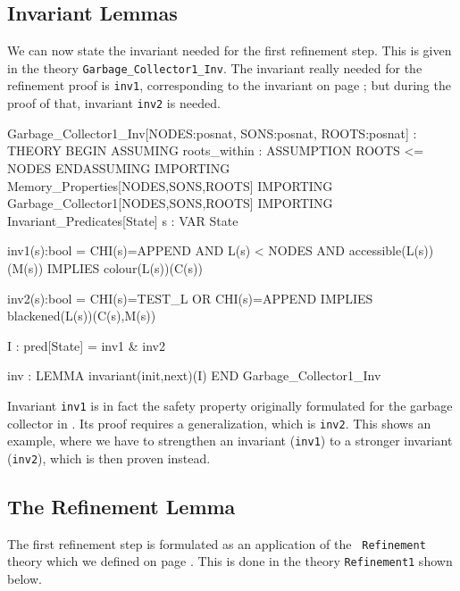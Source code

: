 \subsection{Invariant Lemmas}

We can now state  the invariant needed  for the first refinement step. 
This  is given in  the  theory {\tt Garbage\_Collector1\_Inv}\@.   The
invariant really needed    for the refinement  proof is    {\tt inv1},
corresponding to the invariant on page \pageref{refinement1-inv1}; but
during the proof of that, invariant {\tt inv2} is needed.

\begin{smallsession}
Garbage_Collector1_Inv[NODES:posnat, SONS:posnat, ROOTS:posnat] : THEORY
BEGIN
  ASSUMING
    roots_within : ASSUMPTION ROOTS <= NODES
  ENDASSUMING
  IMPORTING Memory_Properties[NODES,SONS,ROOTS]
  IMPORTING Garbage_Collector1[NODES,SONS,ROOTS]
  IMPORTING Invariant_Predicates[State]
  s : VAR State

  inv1(s):bool =
    CHI(s)=APPEND AND L(s) < NODES AND accessible(L(s))(M(s)) 
      IMPLIES colour(L(s))(C(s))

  inv2(s):bool =
    CHI(s)=TEST_L OR CHI(s)=APPEND IMPLIES blackened(L(s))(C(s),M(s))

  I : pred[State] = inv1 & inv2

  inv : LEMMA invariant(init,next)(I)
END Garbage_Collector1_Inv
\end{smallsession}
\label{invariant-lemmas-refinement1}

Invariant  {\tt inv1} is    in fact  the safety property    originally
formulated   for  the garbage  collector  in \cite{Rus:GC}\@.    Its  proof
requires  a  generalization,  which is   {\tt  inv2}\@.   This shows  an
example,  where we have to strengthen  an invariant ({\tt  inv1}) to a
stronger invariant ({\tt inv2}), which is then proven instead.


\subsection{The Refinement Lemma}

The first refinement step is formulated as an  application of the {\tt
  Refinement} theory which we defined  on page \pageref{pvs-mappings}\@. 
This is done in the theory  {\tt Refinement1} shown below.  

